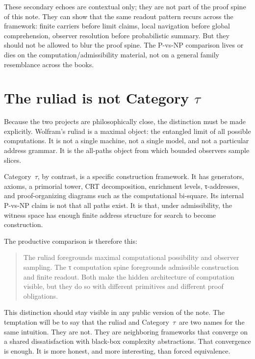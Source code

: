 \documentclass{pantarhei-researchnote}
\newcommand{\CategoryTau}{Category~\(\tau\)}
\begin{document}
These secondary echoes are contextual only; they are not part of the
proof spine of this note. They can show that the same readout pattern
recurs across the framework: finite carriers before limit claims, local
navigation before global comprehension, observer resolution before
probabilistic summary. But they should not be allowed to blur the proof
spine. The P-vs-NP comparison lives or dies on the
computation/admissibility material, not on a general family resemblance
across the books.

\section{The ruliad is not \texorpdfstring{Category $\tau$}{Category tau}}
\label{sec:ruliad}

Because the two projects are philosophically close, the distinction must
be made explicitly. Wolfram's ruliad is a maximal object: the entangled
limit of all possible computations. It is not a single machine, not a
single model, and not a particular address grammar. It is the all-paths
object from which bounded observers sample slices.

\CategoryTau, by contrast, is a specific construction framework. It has
generators, axioms, a primorial tower, CRT decomposition, enrichment
levels, τ-addresses, and proof-organizing diagrams such as the
computational bi-square. Its internal P-vs-NP claim is not that all paths
exist. It is that, under admissibility, the witness space has enough
finite address structure for search to become construction.

The productive comparison is therefore this:

\begin{quote}\small
The ruliad foregrounds maximal computational possibility and observer
sampling. The τ computation spine foregrounds admissible construction and
finite readout. Both make the hidden architecture of computation visible,
but they do so with different primitives and different proof obligations.
\end{quote}

This distinction should stay visible in any public version of the note.
The temptation will be to say that the ruliad and \CategoryTau\ are two
names for the same intuition. They are not. They are neighboring
frameworks that converge on a shared dissatisfaction with black-box
complexity abstractions. That convergence is enough. It is more honest,
and more interesting, than forced equivalence.
\end{document}
